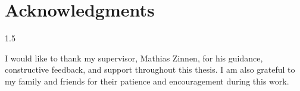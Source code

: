\chapter*{Acknowledgments}

\begin{spacing}{1.5}

I would like to thank my supervisor, Mathias Zinnen, for his guidance,
constructive feedback, and support throughout this thesis. I am also grateful
to my family and friends for their patience and encouragement during this
work.

\end{spacing}

\clearpage
